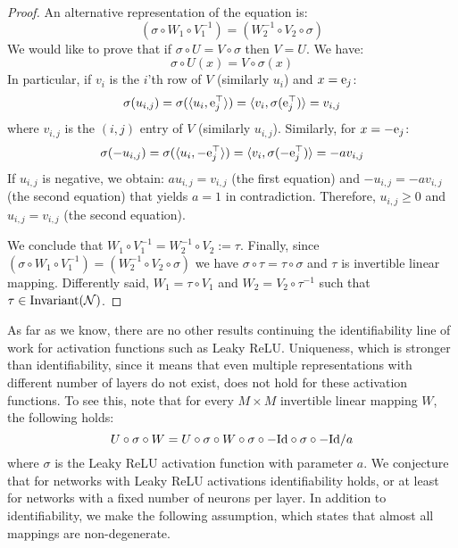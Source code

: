 \documentclass{article} %
\newcommand{\Id}{\textnormal{Id}}
\newcommand{\Inv}{\textnormal{Invariant}}
\begin{document}
\begin{proof} An alternative representation of the equation is:
\begin{equation}
(\sigma \circ W_1\circ V^{-1}_1) = (W_2^{-1} \circ V_2 \circ \sigma)
\end{equation}
We would like to prove that if $\sigma \circ U = V \circ \sigma$ then $V = U$. We have:
\begin{equation}
\sigma \circ U(x) = V \circ \sigma (x)
\end{equation}
In particular, if $v_i$ is the $i$'th row of $V$ (similarly $u_i$) and $x = \textnormal{e}_j$:
\begin{equation}
\sigma(u_{i,j}) = \sigma (\langle u_i, \textnormal{e}^{\top}_j \rangle)  = \langle v_i , \sigma (\textnormal{e}^{\top}_j) \rangle = v_{i,j}
\end{equation}
where $v_{i,j}$ is the $(i,j)$ entry of $V$ (similarly $u_{i,j}$). Similarly, for $x = -\textnormal{e}_j$:
\begin{equation}
\sigma(-u_{i,j}) = \sigma (\langle u_i, -\textnormal{e}^{\top}_j \rangle)  = \langle v_i , \sigma (-\textnormal{e}^{\top}_j) \rangle = -av_{i,j}
\end{equation}
If $u_{i,j}$ is negative, we obtain: $au_{i,j} = v_{i,j}$ (the first equation) and $-u_{i,j} = -av_{i,j}$ (the second equation) that yields $a = 1$ in contradiction. Therefore, $u_{i,j}\geq 0$ and $u_{i,j} = v_{i,j}$ (the second equation). 

We conclude that $W_1\circ V^{-1}_1 = W_2^{-1} \circ V_2 := \tau$. Finally, since  $(\sigma \circ W_1\circ V^{-1}_1) = (W_2^{-1} \circ V_2 \circ \sigma)$ we have $\sigma \circ \tau = \tau \circ \sigma$ and $\tau$ is invertible linear mapping. Differently said, $W_1 = \tau \circ V_1$ and $W_2 = V_2 \circ \tau^{-1}$ such that $\tau \in \Inv(\mathcal{N})$.
\end{proof}

As far as we know, there are no other results continuing the identifiability line of work for activation functions such as Leaky ReLU. Uniqueness, which is stronger than identifiability, since it means that even multiple representations with different number of layers do not exist, does not hold for these activation functions. To see this, note that for every $M \times M$ invertible linear mapping $W$, the following holds: 
\begin{equation}
U \circ \sigma \circ W = U \circ \sigma \circ W \circ \sigma \circ -\Id \circ \sigma \circ  -\Id/a
\end{equation}
where $\sigma$ is the Leaky ReLU activation function with parameter $a$.
We conjecture that for networks with Leaky ReLU activations identifiability holds, or at least for networks with a fixed number of neurons per layer.  In addition to identifiability, we make the following assumption, which states that almost all mappings are non-degenerate.
\end{document}
